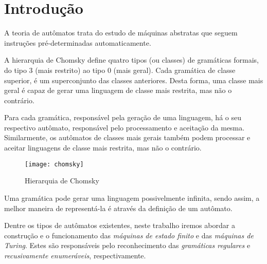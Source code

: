 \section{Introdução}

A teoria de autômatos trata do estudo de máquinas abstratas que seguem
instruções pré-determinadas automaticamente.

A hierarquia de Chomsky define quatro tipos (ou classes) de gramáticas formais,
do tipo 3 (mais restrito) ao tipo 0 (mais geral). Cada gramática de classe
superior, é um superconjunto das classes anteriores. Desta forma, uma classe
mais geral é capaz de gerar uma linguagem de classe mais restrita, mas não o
contrário.

Para cada gramática, responsável pela geração de uma linguagem, há o seu
respectivo autômato, responsável pelo processamento e aceitação da mesma.
Similarmente, os autômatos de classes mais gerais também podem processar e
aceitar linguagens de classe mais restrita, mas não o contrário.

\begin{figure}[H]
    \centering
    \texttt{[image: chomsky]}
    \caption{Hierarquia de Chomsky \cite{fitch}}
    \label{fig:chomsky}
\end{figure}

Uma gramática pode gerar uma linguagem possivelmente infinita, sendo assim, a
melhor maneira de representá-la é através da definição de um autômato.

Dentre os tipos de autômatos existentes, neste trabalho iremos abordar a
construção e o funcionamento das \emph{máquinas de estado finito} e das
\emph{máquinas de Turing}. Estes são responsáveis pelo reconhecimento das
\emph{gramáticas regulares } e \emph{recusivamente enumeráveis},
respectivamente.
